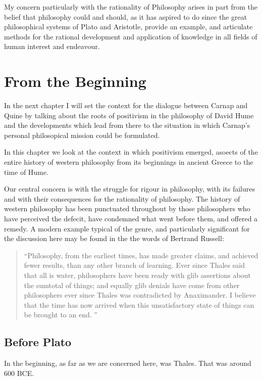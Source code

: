 My concern particularly with the rationality of Philosophy arises in part from the belief that philosophy could and should, as it has aspired to do since the great philosophical systems of Plato and Aristotle, provide an example, and articulate methods for the rational development and application of knowledge in all fields of human interest and endeavour.

\chapter{From the Beginning}

In the next chapter I will set the context for the dialogue between Carnap and Quine by talking about the roots of positivism in the philosophy of David Hume and the developments which lead from there to the situation in which Carnap's personal philosopical mission could be formulated.

In this chapter we look at the context in which positivism emerged, asoects of the entire history of western philosophy from its beginnings in ancient Greece to the time of Hume.

Our central concern is with the struggle for rigour in philosophy, with its failures and with their consequences for the rationality of philosophy.
The history of western philosophy has been punctuated throughout by those philosophers who have perceived the defecit, have condemned what went before them, and offered a remedy.
A modern example typical of the genre, and particularly significant for the discussion here may be found in the the words of Bertrand Russell:

\begin{quote}

``Philosophy, from the earliest times, has made greater claims, and achieved
fewer results, than any other branch of learning. Ever since Thales said that
all is water, philosophers have been ready with glib assertions about the sumtotal
of things; and equally glib denials have come from other philosophers ever
since Thales was contradicted by Anaximander.
I believe that the time has
now arrived when this unsatisfactory state of things can be brought to an end.
''
\end{quote}


\section{Before Plato}

In the beginning, as far as we are concerned here, was Thales.
That was around 600 BCE.

